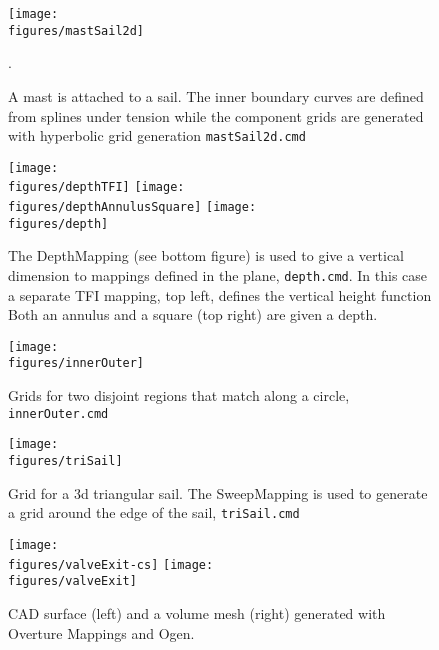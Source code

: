 \documentclass[xcolor=rgb,svgnames,dvipsnames]{article}
\newcommand{\figures}{\homeHenshaw/OvertureFigures}
\begin{document}
\begin{figure}[hbt]
  \begin{center}
   \texttt{[image: \\figures/mastSail2d]}
  \caption{A mast is attached to a sail. The inner boundary curves are defined from splines under tension
    while the component grids are generated with hyperbolic grid generation {\tt mastSail2d.cmd}}. 
  \end{center}
\end{figure}

\begin{figure}[hbt]
  \begin{center}
   \texttt{[image: \\figures/depthTFI]}
   \texttt{[image: \\figures/depthAnnulusSquare]}
   \texttt{[image: \\figures/depth]}
  \caption{The DepthMapping (see bottom figure) 
           is used to give a vertical dimension to mappings defined in the plane, {\tt depth.cmd}.
           In this case a separate TFI mapping, top left, defines the vertical height function
           Both an annulus and a square (top right) are given a depth.}
  \end{center}
\end{figure}

\begin{figure}[hbt]
\begin{center}
   \texttt{[image: \\figures/innerOuter]}
  \caption{Grids for two disjoint regions that match along a circle, {\tt innerOuter.cmd}}\label{fig:innerOuter}
\end{center}
\end{figure}


\begin{figure}[hbt]
  \begin{center}
   \texttt{[image: \\figures/triSail]}
  \caption{Grid for a 3d triangular sail. The SweepMapping is used to generate a grid around
    the edge of the sail, {\tt triSail.cmd}}
  \end{center}
\end{figure}

\begin{figure}[hbt]
\begin{center}
   \texttt{[image: \\figures/valveExit-cs]}
   \texttt{[image: \\figures/valveExit]}
  \caption{CAD surface (left) and a volume mesh (right) generated with Overture Mappings and Ogen. }
\end{center}
\end{figure}
\end{document}
